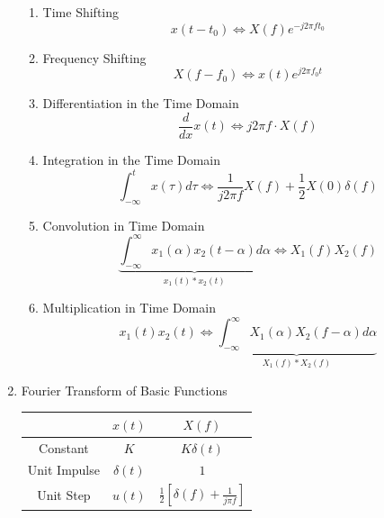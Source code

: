 \documentclass{article}
\begin{document}
\begin{enumerate}
\begin{enumerate}
        \item Time Shifting
        \begin{equation}
            x(t-t_0) \Longleftrightarrow X(f)e^{-j2\pi ft_0}
        \end{equation}
        \item Frequency Shifting
        \begin{equation}
            X(f-f_0) \Longleftrightarrow x(t)e^{j2\pi f_0t}
        \end{equation}
        \item Differentiation in the Time Domain
        \begin{equation}
            \frac{d}{dx}x(t) \Longleftrightarrow j2\pi f \cdot X(f)
        \end{equation}
        \item Integration in the Time Domain
        \begin{equation}
            \int^t_{-\infty}x(\tau)d\tau \Longleftrightarrow \frac{1}{j2\pi f}X(f)+\frac{1}{2}X(0)\delta(f) 
        \end{equation}
        \item Convolution in Time Domain
        \begin{equation}
            \underbrace{\int^{\infty}_{-\infty}x_1(\alpha)x_2(t-\alpha)d\alpha}_\text{$x_1(t)*x_2(t)$}\Longleftrightarrow X_1(f)X_2(f)
        \end{equation}
        \item Multiplication in Time Domain
        \begin{equation}
            x_1(t)x_2(t)\Longleftrightarrow \underbrace{\int^{\infty}_{-\infty}X_1(\alpha)X_2(f-\alpha)d\alpha}_\text{$X_1(f)*X_2(f)$}
        \end{equation}
    \end{enumerate}
    \newpage
    \item Fourier Transform of Basic Functions
    \begin{table}[h]
        \setlength{\arrayrulewidth}{0.3mm}
        \renewcommand{\arraystretch}{1.93}
        \centering
        \begin{tabular}{|c|c|c|}
        \hline
        &   $x(t)$     & $X(f)$ \\
        \hline
        Constant & $K$ & $K\delta(t)$ \\
        \hline
        Unit Impulse & $\delta(t)$ & $1$ \\
        \hline
        Unit Step & $u(t)$ & $\displaystyle \frac{1}{2}[\delta(f) + \frac{1}{j\pi f}]$ \\

\end{tabular}
\end{table}
\end{enumerate}
\end{document}
